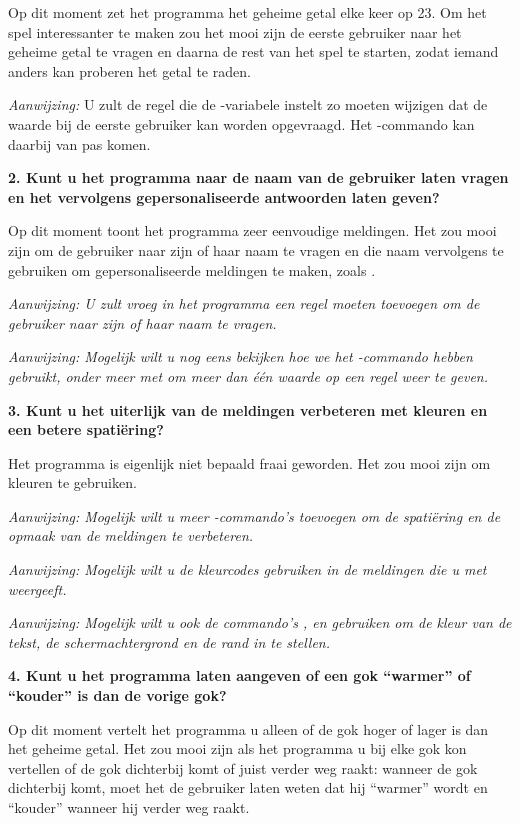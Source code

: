 Op dit moment zet het programma het geheime getal elke keer op 23. Om het spel interessanter te maken zou het mooi zijn de eerste gebruiker naar het geheime getal te vragen en daarna de rest van het spel te starten, zodat iemand anders kan proberen het getal te raden.

{\em Aanwijzing:} U zult de regel die de -variabele instelt zo moeten wijzigen dat de waarde bij de eerste gebruiker kan worden opgevraagd. Het -commando kan daarbij van pas komen.

{\bf 2. Kunt u het programma naar de naam van de gebruiker laten vragen en het vervolgens gepersonaliseerde antwoorden laten geven?}

Op dit moment toont het programma zeer eenvoudige meldingen. Het zou mooi zijn om de gebruiker naar zijn of haar naam te vragen en die naam vervolgens te gebruiken om gepersonaliseerde meldingen te maken, zoals .

{\em Aanwijzing: U zult vroeg in het programma een regel moeten toevoegen om de gebruiker naar zijn of haar naam te vragen.}

{\em Aanwijzing: Mogelijk wilt u nog eens bekijken hoe we het -commando hebben gebruikt, onder meer met \stw{;} om meer dan één waarde op een regel weer te geven.}

{\bf 3. Kunt u het uiterlijk van de meldingen verbeteren met kleuren en een betere spatiëring?}

Het programma is eigenlijk niet bepaald fraai geworden. Het zou mooi zijn om kleuren te gebruiken.

{\em Aanwijzing: Mogelijk wilt u meer -commando's toevoegen om de spatiëring en de opmaak van de meldingen te verbeteren.}

{\em Aanwijzing: Mogelijk wilt u de kleurcodes gebruiken in de meldingen die u met  weergeeft.}

{\em Aanwijzing: Mogelijk wilt u ook de commando's ,  en  gebruiken om de kleur van de tekst, de schermachtergrond en de rand in te stellen.}


{\bf 4. Kunt u het programma laten aangeven of een gok ``warmer'' of ``kouder'' is dan de vorige gok?}

Op dit moment vertelt het programma u alleen of de gok hoger of lager is dan het geheime getal. Het zou mooi zijn als het programma u bij elke gok kon vertellen of de gok dichterbij komt of juist verder weg raakt: wanneer de gok dichterbij komt, moet het de gebruiker laten weten dat hij ``warmer'' wordt en ``kouder'' wanneer hij verder weg raakt.

